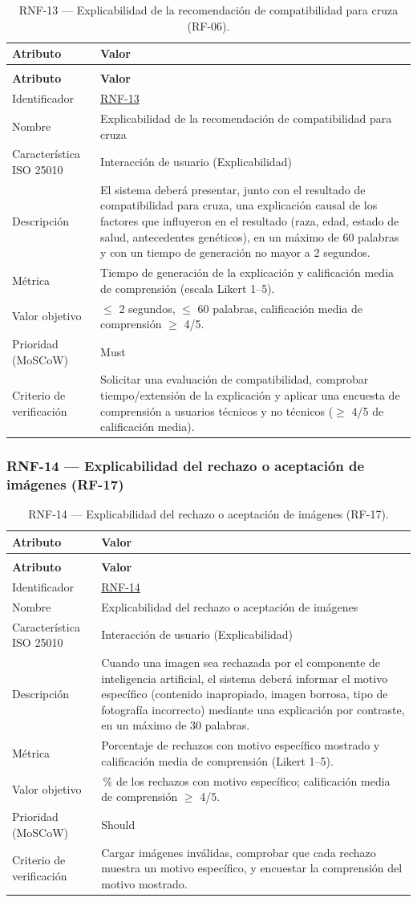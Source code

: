 \documentclass[journal,onecolumn]{IEEEtran}
\makeatletter
\newenvironment{atributos}[2]{%
	\small
	\begin{longtable}{@{}>{\raggedright\arraybackslash}p{4.2cm} >{\raggedright\arraybackslash}p{11.2cm}@{}}
		\caption{#2}\label{tab:#1}\\
		\toprule
		\textbf{Atributo} & \textbf{Valor} \\
		\midrule
		\endfirsthead
		\multicolumn{2}{@{}l}{\small\itshape (continuación)}\\
		\toprule
		\textbf{Atributo} & \textbf{Valor} \\
		\midrule
		\endhead
		\bottomrule
		\endlastfoot
	}{%
	\end{longtable}
	\normalsize
}
\makeatother
\begin{document}
	\begin{atributos}{RNF-13}{RNF-13 --- Explicabilidad de la recomendación de compatibilidad para cruza (RF-06).}
		Identificador & \hyperref[tab:RNF-13]{RNF-13} \\
		Nombre & Explicabilidad de la recomendación de compatibilidad para cruza \\
		Característica ISO 25010 & Interacción de usuario (Explicabilidad) \\
		Descripción & El sistema deberá presentar, junto con el resultado de compatibilidad para cruza, una explicación causal de los factores que influyeron en el resultado (raza, edad, estado de salud, antecedentes genéticos), en un máximo de 60 palabras y con un tiempo de generación no mayor a 2 segundos. \\
		Métrica & Tiempo de generación de la explicación y calificación media de comprensión (escala Likert 1--5). \\
		Valor objetivo & $\leq$ 2 segundos, $\leq$ 60 palabras, calificación media de comprensión $\geq$ 4/5. \\
		Prioridad (MoSCoW) & Must \\
		Criterio de verificación & Solicitar una evaluación de compatibilidad, comprobar tiempo/extensión de la explicación y aplicar una encuesta de comprensión a usuarios técnicos y no técnicos ($\geq$ 4/5 de calificación media). \\
	\end{atributos}
	
	\subsubsection{RNF-14 --- Explicabilidad del rechazo o aceptación de imágenes (RF-17)}
	
	\begin{atributos}{RNF-14}{RNF-14 --- Explicabilidad del rechazo o aceptación de imágenes (RF-17).}
		Identificador & \hyperref[tab:RNF-14]{RNF-14} \\
		Nombre & Explicabilidad del rechazo o aceptación de imágenes \\
		Característica ISO 25010 & Interacción de usuario (Explicabilidad) \\
		Descripción & Cuando una imagen sea rechazada por el componente de inteligencia artificial, el sistema deberá informar el motivo específico (contenido inapropiado, imagen borrosa, tipo de fotografía incorrecto) mediante una explicación por contraste, en un máximo de 30 palabras. \\
		Métrica & Porcentaje de rechazos con motivo específico mostrado y calificación media de comprensión (Likert 1--5). \\
		Valor objetivo & 100\,\% de los rechazos con motivo específico; calificación media de comprensión $\geq$ 4/5. \\
		Prioridad (MoSCoW) & Should \\
		Criterio de verificación & Cargar imágenes inválidas, comprobar que cada rechazo muestra un motivo específico, y encuestar la comprensión del motivo mostrado. \\
	\end{atributos}
	
\end{document}
